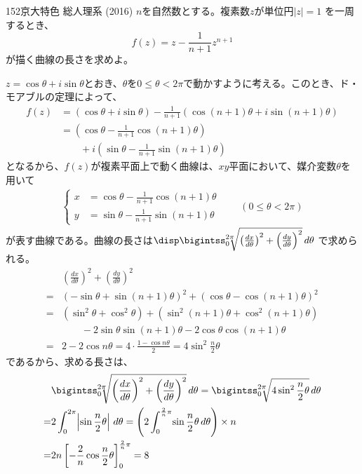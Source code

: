 \begin{thm}{152}{\maru}{京大特色 総人理系 (2016)}
 $n$を自然数とする。複素数$z$が単位円$|z|=1$ を一周するとき、
 \[ f(z) = z - \frac{1}{n+1}z^{n+1} \]
 が描く曲線の長さを求めよ。
\end{thm}

$z=\cos\theta+i\sin\theta$とおき、$\theta$を$0\le\theta <2\pi$で動かすように考える。このとき、ド・モアブルの定理によって、
\begin{align*}
 f(z)&=(\cos\theta+i\sin\theta)-\frac{1}{n+1}\left(\cos(n+1)\theta+i\sin(n+1)\theta\right) \\
 &=\left(\cos\theta-\frac{1}{n+1}\cos(n+1)\theta\right) \\
 &\qquad +i\left(\sin\theta-\frac{1}{n+1}\sin(n+1)\theta\right)
\end{align*}
となるから、$f(z)$が複素平面上で動く曲線は、$xy$平面において、媒介変数$\theta$を用いて
\begin{align*}
 \left\{
 \begin{aligned}
  x&=\cos\theta-\frac{1}{n+1}\cos(n+1)\theta \\
  y&=\sin\theta-\frac{1}{n+1}\sin(n+1)\theta
 \end{aligned}
 \right. \qquad (0\le \theta < 2\pi)
\end{align*}
が表す曲線である。曲線の長さは$\disp \bigintss_0^{2\pi}\!\!\! \sqrt{\left(\frac{dx}{d\theta}\right)^2+\left(\frac{dy}{d\theta}\right)^2} \,d\theta$ で求められる。
\begin{align*}
 &\left(\frac{dx}{d\theta}\right)^2+\left(\frac{dy}{d\theta}\right)^2 \\
=&(-\sin\theta+\sin(n+1)\theta)^2+(\cos\theta-\cos(n+1)\theta)^2 \\
 =& (\sin^2\theta+\cos^2\theta)+(\sin^2(n+1)\theta+\cos^2(n+1)\theta) \\
 & \qquad -2\sin\theta\sin(n+1)\theta-2\cos\theta\cos(n+1)\theta \\
 =& 2-2\cos n\theta =4\cdot\frac{1-\cos n\theta}{2} = 4\sin^2\frac{n}{2}\theta
\end{align*}
であるから、求める長さは、
\begin{align*}
 &\bigintss_0^{2\pi}\!\!\!\sqrt{\left(\frac{dx}{d\theta}\right)^2+\left(\frac{dy}{d\theta}\right)^2} \,d\theta=\bigintss_0^{2\pi}\!\!\!\sqrt{4\sin^2\frac{n}{2}\theta} \,d\theta \\
 =&2\int_0^{2\pi}\!\left|\sin\frac{n}{2}\theta\right| \,d\theta = \left(2\int_0^{\frac{2}{n}\pi}\! \sin\frac{n}{2}\theta \,d\theta \right) \times n \\
 =& 2n\left[-\frac{2}{n}\cos\frac{n}{2}\theta\right]^{\frac{2}{n}\pi}_0=8
\end{align*}